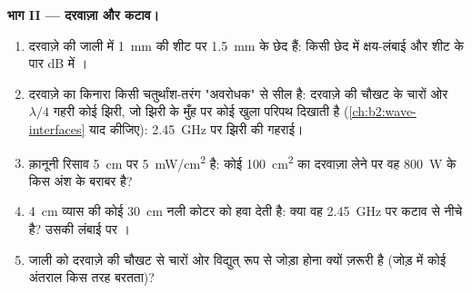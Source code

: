 \begin{problem}
\medskip
\noindent\textbf{भाग II --- दरवाज़ा और कटाव।}
\begin{enumerate}[resume]
  \item दरवाज़े की जाली में \qty{1}{mm} की शीट पर \qty{1.5}{mm} के छेद हैं:
        किसी छेद में क्षय-लंबाई और शीट के पार dB में ।
  \item दरवाज़े का किनारा किसी चतुर्थांश-तरंग "अवरोधक" से सील है:
        दरवाज़े की चौखट के चारों ओर $\lambda/4$ गहरी कोई झिरी, जो झिरी के मुँह पर
        कोई खुला परिपथ दिखाती है (\cref{ch:b2:wave-interfaces} याद कीजिए):
        \qty{2.45}{GHz} पर झिरी की गहराई।
  \item क़ानूनी रिसाव \qty{5}{cm} पर \qty{5}{mW/cm^2} है: कोई \qty{100}{cm^2} का
        दरवाज़ा लेने पर वह \qty{800}{W} के किस अंश के बराबर है?
  \item \qty{4}{cm} व्यास की कोई \qty{30}{cm} नली कोटर को हवा देती है: क्या वह
        \qty{2.45}{GHz} पर कटाव से नीचे है? उसकी लंबाई पर ।
  \item जाली को दरवाज़े की चौखट से चारों ओर विद्युत् रूप से जोड़ा होना
        क्यों ज़रूरी है (जोड़ में कोई अंतराल किस तरह बरतता)?
\end{enumerate}


\end{problem}
